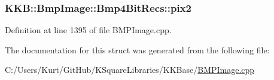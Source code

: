\subsubsection[{\texorpdfstring{pix2}{pix2}}]{ K\+K\+B\+::\+Bmp\+Image\+::\+Bmp4\+Bit\+Recs\+::pix2}\hypertarget{struct_bmp_image_1_1_bmp4_bit_recs_a45bbfafb3159533bb2322a4eebe265de}{}\label{struct_bmp_image_1_1_bmp4_bit_recs_a45bbfafb3159533bb2322a4eebe265de}


Definition at line 1395 of file B\+M\+P\+Image.\+cpp.



The documentation for this struct was generated from the following file\+:\begin{DoxyCompactItemize}
\item 
C\+:/\+Users/\+Kurt/\+Git\+Hub/\+K\+Square\+Libraries/\+K\+K\+Base/\hyperlink{_b_m_p_image_8cpp}{B\+M\+P\+Image.\+cpp}\end{DoxyCompactItemize}
